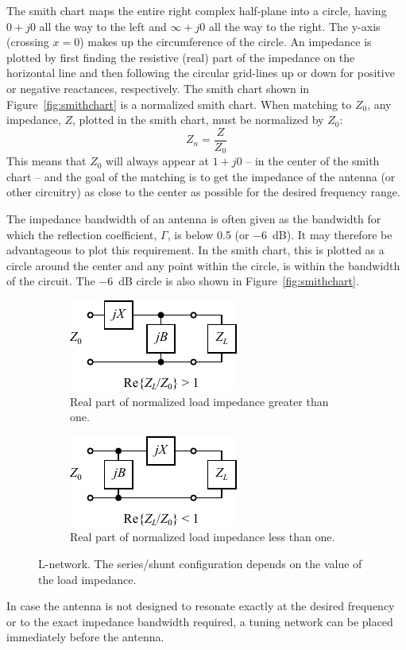 The smith chart maps the entire right complex half-plane into a circle, having $0+j0$ all the way to the left and $\infty+j0$ all the way to the right. The y-axis (crossing $x=0$) makes up the circumference of the circle. An impedance is plotted by first finding the resistive (real) part of the impedance on the horizontal line and then following the circular grid-lines up or down for positive or negative reactances, respectively. 
The smith chart shown in Figure~\ref{fig:smithchart} is a normalized smith chart. When matching to $Z_0$, any impedance, $Z$, plotted in the smith chart, must be normalized by $Z_0$:
\begin{equation}
    Z_n = \frac{Z}{Z_0}
\end{equation}
This means that $Z_0$ will always appear at $1+j0$ -- in the center of the smith chart -- and the goal of the matching is to get the impedance of the antenna (or other circuitry) as close to the center as possible for the desired frequency range.

The impedance bandwidth of an antenna is often given as the bandwidth for which the reflection coefficient, $\Gamma$, is below 0.5 (or \SI{-6}{dB}). It may therefore be advantageous to plot this requirement. In the smith chart, this is plotted as a circle around the center and any point within the circle, is within the bandwidth of the circuit. The \SI{-6}{dB} circle is also shown in Figure~\ref{fig:smithchart}.

\begin{figure}[htbp]
    \begin{subfigure}{0.49\linewidth}
        \centering
        \includegraphics{img/analysis/l_network_a}
        \caption{Real part of normalized load impedance greater than one.}
        \label{fig:l_network_a}
    \end{subfigure}
    \hfill
    \begin{subfigure}{0.49\linewidth}
        \centering
        \includegraphics{img/analysis/l_network_b}
        \caption{Real part of normalized load impedance less than one.}
        \label{fig:l_network_b}
    \end{subfigure}
    \caption{L-network. The series/shunt configuration depends on the value of the load impedance.}
    \label{fig:l_network}
\end{figure}
In case the antenna is not designed to resonate exactly at the desired frequency or to the exact impedance bandwidth required, a tuning network can be placed immediately before the antenna. 

